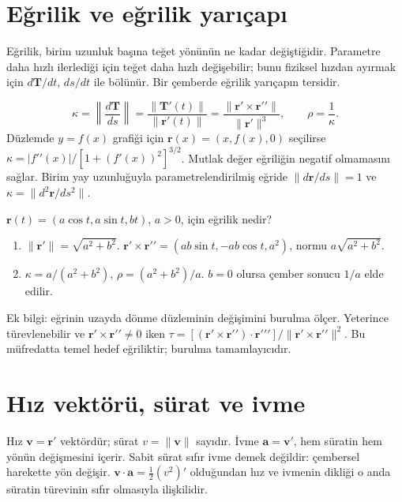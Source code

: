 \section{Eğrilik ve eğrilik yarıçapı}
Eğrilik, birim uzunluk başına teğet yönünün ne kadar değiştiğidir. Parametre daha hızlı ilerlediği için teğet daha hızlı değişebilir; bunu fiziksel hızdan ayırmak için \(d\mathbf T/dt\), \(ds/dt\) ile bölünür. Bir çemberde eğrilik yarıçapın tersidir.


{\small\[
\kappa=\left\|\frac{d\mathbf T}{ds}\right\|=\frac{\|\mathbf T\prime(t)\|}{\|\mathbf r\prime(t)\|}=\frac{\|\mathbf r\prime\times\mathbf r\prime\prime\|}{\|\mathbf r\prime\|^3},\qquad \rho=\frac1\kappa.
\]}
Düzlemde \(y=f(x)\) grafiği için \(\mathbf r(x)=(x,f(x),0)\) seçilirse \(\kappa=|f\prime\prime(x)|/[1+(f\prime(x))^2]^{3/2}\). Mutlak değer eğriliğin negatif olmamasını sağlar. Birim yay uzunluğuyla parametrelendirilmiş eğride \(\|d\mathbf r/ds\|=1\) ve \(\kappa=\|d^2\mathbf r/ds^2\|\).

\begin{tcolorbox}[title={Örnek 3.15 | Genel helisin eğriliği},colframe=accent]\(\mathbf r(t)=(a\cos t,a\sin t,bt)\), \(a>0\), için eğrilik nedir?
\par\vspace{1mm}{\scriptsize\sffamily Pekiştirme}\end{tcolorbox}
\begin{tcolorbox}[title={Adım adım çözüm},colback=green!3!white,colframe=green]\begin{enumerate}
\item \(\|\mathbf r\prime\|=\sqrt{a^2+b^2}\). \(\mathbf r\prime\times\mathbf r\prime\prime=(ab\sin t,-ab\cos t,a^2)\), normu \(a\sqrt{a^2+b^2}\).
\item \(\kappa=a/(a^2+b^2)\), \(\rho=(a^2+b^2)/a\). \(b=0\) olursa çember sonucu \(1/a\) elde edilir.
\end{enumerate}\end{tcolorbox}
Ek bilgi: eğrinin uzayda dönme düzleminin değişimini burulma ölçer. Yeterince türevlenebilir ve \(\mathbf r\prime\times\mathbf r\prime\prime\ne0\) iken \(\tau=[(\mathbf r\prime\times\mathbf r\prime\prime)\cdot\mathbf r\prime\prime\prime]/\|\mathbf r\prime\times\mathbf r\prime\prime\|^2\). Bu müfredatta temel hedef eğriliktir; burulma tamamlayıcıdır.

\section{Hız vektörü, sürat ve ivme}
Hız \(\mathbf v=\mathbf r\prime\) vektördür; sürat \(v=\|\mathbf v\|\) sayıdır. İvme \(\mathbf a=\mathbf v\prime\), hem süratin hem yönün değişmesini içerir. Sabit sürat sıfır ivme demek değildir: çembersel harekette yön değişir. \(\mathbf v\cdot\mathbf a=\tfrac12(v^2)\prime\) olduğundan hız ve ivmenin dikliği o anda süratin türevinin sıfır olmasıyla ilişkilidir.

